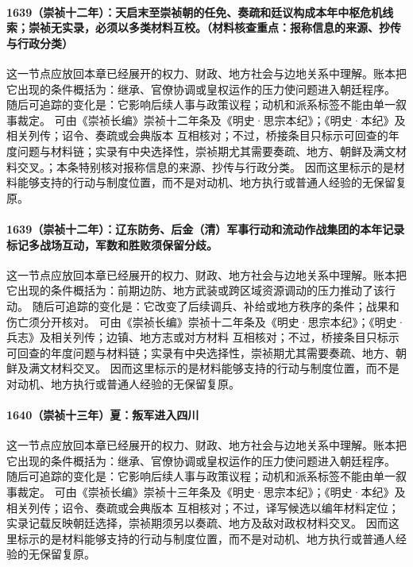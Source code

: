 \paragraph{1639（崇祯十二年）：天启末至崇祯朝的任免、奏疏和廷议构成本年中枢危机线索；崇祯无实录，必须以多类材料互校。（材料核查重点：报称信息的来源、抄传与行政分类）} 这一节点应放回本章已经展开的权力、财政、地方社会与边地关系中理解。账本把它出现的条件概括为：继承、官僚协调或皇权运作的压力使问题进入朝廷程序。 随后可追踪的变化是：它影响后续人事与政策议程；动机和派系标签不能由单一叙事裁定。 可由《崇祯长编》崇祯十二年条及《明史·思宗本纪》；《明史·本纪》及相关列传；诏令、奏疏或会典版本 互相核对；不过，桥接条目只标示可回查的年度问题与材料链；实录有中央选择性，崇祯期尤其需要奏疏、地方、朝鲜及满文材料交叉。；本条特别核对报称信息的来源、抄传与行政分类。 因而这里标示的是材料能够支持的行动与制度位置，而不是对动机、地方执行或普通人经验的无保留复原。

\paragraph{1639（崇祯十二年）：辽东防务、后金（清）军事行动和流动作战集团的本年记录标记多战场互动，军数和胜败须保留分歧。} 这一节点应放回本章已经展开的权力、财政、地方社会与边地关系中理解。账本把它出现的条件概括为：前期边防、地方武装或跨区域资源调动的压力推动了该行动。 随后可追踪的变化是：它改变了后续调兵、补给或地方秩序的条件；战果和伤亡须分开核对。 可由《崇祯长编》崇祯十二年条及《明史·思宗本纪》；《明史·兵志》及相关列传；边镇、地方志或对方材料 互相核对；不过，桥接条目只标示可回查的年度问题与材料链；实录有中央选择性，崇祯期尤其需要奏疏、地方、朝鲜及满文材料交叉。 因而这里标示的是材料能够支持的行动与制度位置，而不是对动机、地方执行或普通人经验的无保留复原。

\paragraph{1640（崇祯十三年）夏：叛军进入四川} 这一节点应放回本章已经展开的权力、财政、地方社会与边地关系中理解。账本把它出现的条件概括为：继承、官僚协调或皇权运作的压力使问题进入朝廷程序。 随后可追踪的变化是：它影响后续人事与政策议程；动机和派系标签不能由单一叙事裁定。 可由《崇祯长编》崇祯十三年条及《明史·思宗本纪》；《明史·本纪》及相关列传；诏令、奏疏或会典版本 互相核对；不过，译写候选以编年材料定位；实录记载反映朝廷选择，崇祯期须另以奏疏、地方及敌对政权材料交叉。 因而这里标示的是材料能够支持的行动与制度位置，而不是对动机、地方执行或普通人经验的无保留复原。

